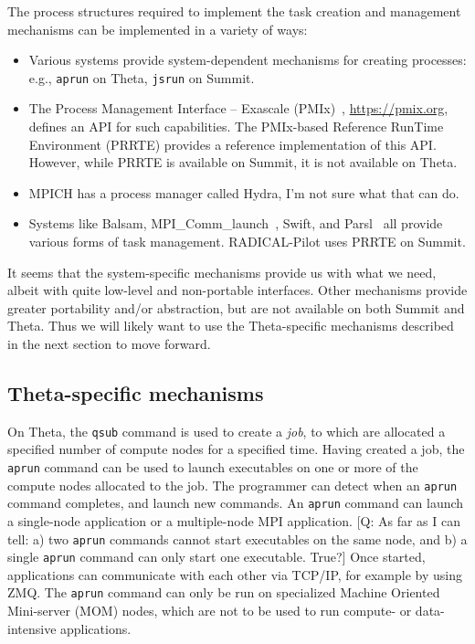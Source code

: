 \documentclass[10pt]{article}
\newcommand\q[1]{{\color{blue}[Q: #1]}}
\begin{document}
The process structures required to implement the task creation and management mechanisms can be implemented in a variety of ways:
\begin{itemize}
    \item
    Various systems provide system-dependent mechanisms for creating processes: e.g., \texttt{aprun} on Theta, \texttt{jsrun} on Summit. 
    \item
    The Process Management Interface -- Exascale (PMIx)~\cite{castain2018pmix}, \url{https://pmix.org}, defines an API for such capabilities.
    The PMIx-based Reference RunTime Environment (PRRTE) provides a reference implementation of this API. However, while PRRTE is available on Summit, it is not available on Theta.
    \item 
    MPICH has a process manager called Hydra, I'm not sure what that can do.
    \item
    Systems like Balsam, MPI\_Comm\_launch~\cite{wozniak2019mpi}, Swift, and Parsl~\cite{babuji19parsl} all provide various forms of task management.
    RADICAL-Pilot uses PRRTE on Summit.
\end{itemize}

It seems that the system-specific mechanisms provide us with what we need, 
albeit with quite low-level and non-portable interfaces. 
Other mechanisms provide greater portability and/or abstraction, 
but are not available on both Summit and Theta.
Thus we will likely want to use the Theta-specific mechanisms described in
the next section to move forward.

\subsection{Theta-specific mechanisms}

On Theta, the \texttt{qsub} command is used to create a \emph{job}, to which are allocated a specified number of compute nodes for a specified time.
Having created a job, the \texttt{aprun} command
can be used to launch
executables on one or more of the compute nodes allocated to the job.
The programmer can detect when an \texttt{aprun} command completes,
and launch new commands.
An \texttt{aprun} command can launch a single-node application or a multiple-node MPI 
application.
\q{As far as I can tell: a) two \texttt{aprun} commands cannot start executables on the 
same node, and b) a single \texttt{aprun} command can only start one executable. True?}
Once started, applications can communicate with each other via TCP/IP, for example
by using ZMQ. 
The \texttt{aprun} command can only be run on specialized Machine Oriented Mini-server (MOM) nodes, which are not to be used to run compute- or data-intensive applications. 
\end{document}
